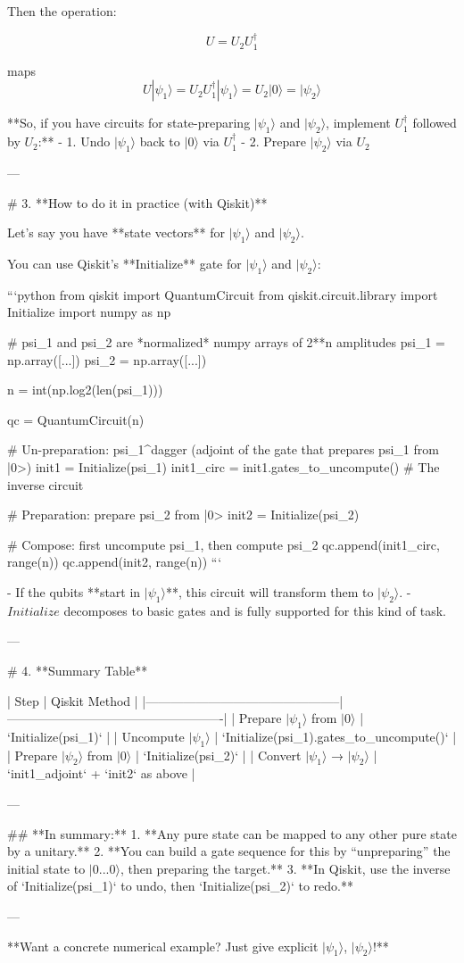 Then the operation:

\[
U = U_2 U_1^\dagger
\]

maps
\[
U |\psi_1\rangle = U_2 U_1^\dagger |\psi_1\rangle = U_2 |0\rangle = |\psi_2\rangle
\]

**So, if you have circuits for state-preparing \(|\psi_1\rangle\) and \(|\psi_2\rangle\), implement \(U_1^\dagger\) followed by \(U_2\):**
- 1. Undo \(|\psi_1\rangle\) back to \(|0\rangle\) via \(U_1^\dagger\)
- 2. Prepare \(|\psi_2\rangle\) via \(U_2\)

---

# 3. **How to do it in practice (with Qiskit)**

Let’s say you have **state vectors** for \(|\psi_1\rangle\) and \(|\psi_2\rangle\).

You can use Qiskit’s **Initialize** gate for \(|\psi_1\rangle\) and \(|\psi_2\rangle\):

```python
from qiskit import QuantumCircuit
from qiskit.circuit.library import Initialize
import numpy as np

# psi_1 and psi_2 are *normalized* numpy arrays of 2**n amplitudes
psi_1 = np.array([...])
psi_2 = np.array([...])

n = int(np.log2(len(psi_1)))

qc = QuantumCircuit(n)

# Un-preparation: psi_1^dagger (adjoint of the gate that prepares psi_1 from |0>)
init1 = Initialize(psi_1)
init1_circ = init1.gates_to_uncompute()   # The inverse circuit

# Preparation: prepare psi_2 from |0>
init2 = Initialize(psi_2)

# Compose: first uncompute psi_1, then compute psi_2
qc.append(init1_circ, range(n))
qc.append(init2, range(n))
```

- If the qubits **start in \(|\psi_1\rangle\)**, this circuit will transform them to \(|\psi_2\rangle\).
- \(Initialize\) decomposes to basic gates and is fully supported for this kind of task.

---

# 4. **Summary Table**

| Step                                          | Qiskit Method                                      |
|-----------------------------------------------|----------------------------------------------------|
| Prepare \(|\psi_1\rangle\) from \(|0\rangle\) | `Initialize(psi_1)`                                |
| Uncompute \(|\psi_1\rangle\)                  | `Initialize(psi_1).gates_to_uncompute()`           |
| Prepare \(|\psi_2\rangle\) from \(|0\rangle\) | `Initialize(psi_2)`                                |
| Convert \(|\psi_1\rangle\) → \(|\psi_2\rangle\) | `init1_adjoint` + `init2` as above                 |

---

## **In summary:**
1. **Any pure state can be mapped to any other pure state by a unitary.**
2. **You can build a gate sequence for this by “unpreparing” the initial state to \(|0...0⟩\), then preparing the target.**
3. **In Qiskit, use the inverse of `Initialize(psi_1)` to undo, then `Initialize(psi_2)` to redo.**

---

**Want a concrete numerical example? Just give explicit \(|\psi_1⟩\), \(|\psi_2⟩\)!**